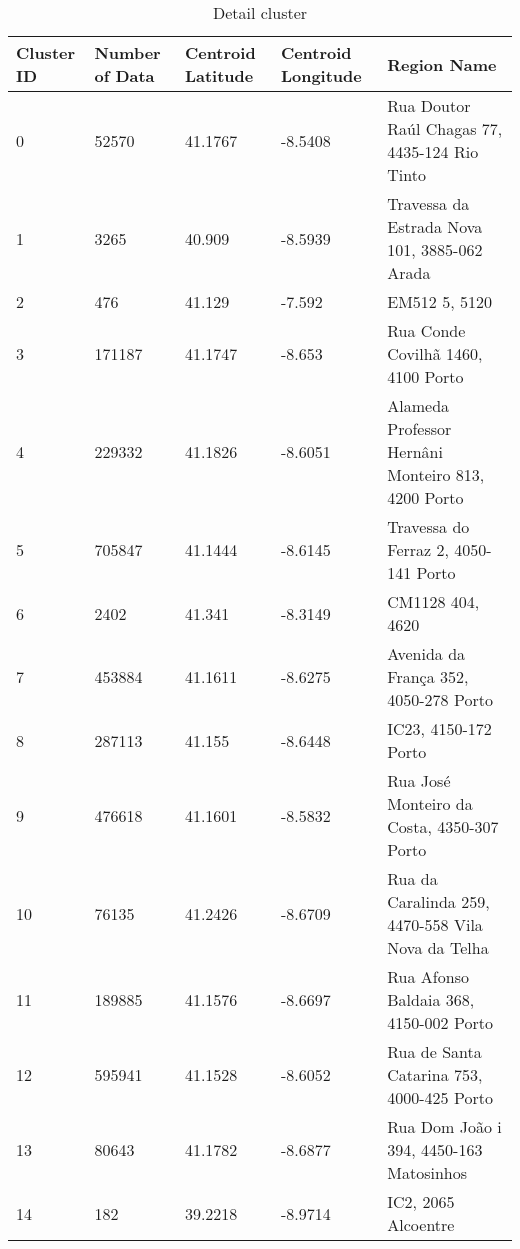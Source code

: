 \documentclass{article}
\begin{document}
\begin{table}
\caption{Detail cluster}
\begin{tabular}{ | l | l | l | l | p{3cm} | }
	\hline
	Cluster ID & Number of Data & Centroid Latitude & Centroid Longitude & Region Name \\ \hline
	
	0 &	52570 &	41.1767 & -8.5408 &	Rua Doutor Raúl Chagas 77, 4435-124 Rio Tinto \\ \hline
	
	1 &
	3265 &
	40.909 &
	-8.5939 &
	Travessa da Estrada Nova 101, 3885-062 Arada \\ \hline
	
	2 &
	476 &
	41.129 &
	-7.592 &
	EM512 5, 5120 \\ \hline
	
	3 &
	171187 &
	41.1747 &
	-8.653 &
	Rua Conde Covilhã 1460, 4100 Porto \\ \hline
	
	4 &
	229332 &
	41.1826 &
	-8.6051 &
	Alameda Professor Hernâni Monteiro 813, 4200 Porto \\ \hline
	
	5 &
	705847 &
	41.1444 &
	-8.6145 &
	Travessa do Ferraz 2, 4050-141 Porto \\ \hline
	
	6 &
	2402 &
	41.341 &
	-8.3149 &
	CM1128 404, 4620 \\ \hline
	
	7 &
	453884 &
	41.1611 &
	-8.6275 &
	Avenida da França 352, 4050-278 Porto \\ \hline
	
	8 &
	287113 &
	41.155 &
	-8.6448 &
	IC23, 4150-172 Porto \\ \hline
	
	9 &
	476618 &
	41.1601 &
	-8.5832 &
	Rua José Monteiro da Costa, 4350-307 Porto \\ \hline
	
	10 &
	76135 &
	41.2426 &
	-8.6709 &
	Rua da Caralinda 259, 4470-558 Vila Nova da Telha \\ \hline
	
	11 &
	189885 &
	41.1576 &
	-8.6697 &
	Rua Afonso Baldaia 368, 4150-002 Porto \\ \hline
	
	12 &
	595941 &
	41.1528 &
	-8.6052 &
	Rua de Santa Catarina 753, 4000-425 Porto \\ \hline
	
	13 &
	80643 &
	41.1782 &
	-8.6877 &
	Rua Dom João i 394, 4450-163 Matosinhos \\ \hline
	
	14 &
	182 &
	39.2218 &
	-8.9714 &
	IC2, 2065 Alcoentre \\
	\hline
\end{tabular}
\end{table}
\end{document}
